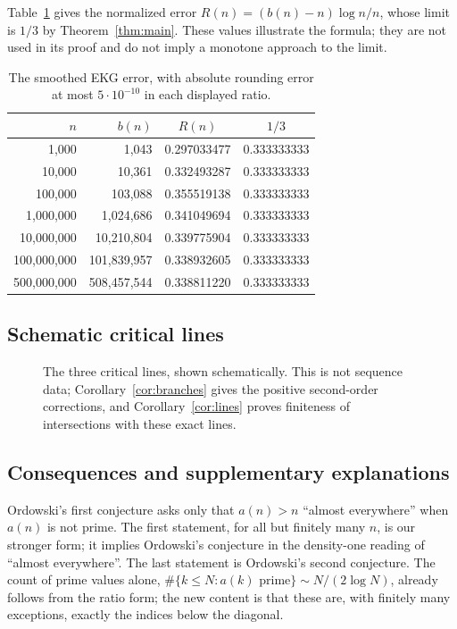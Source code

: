 Table~\ref{tab:ratio-original} gives the normalized error
$R(n)=(b(n)-n)\log n/n$, whose limit is $1/3$ by
Theorem~\ref{thm:main}. These values illustrate the formula; they are
not used in its proof and do not imply a monotone approach to the limit.
\begin{table}[ht]
\centering
\begin{tabular}{r r c c}
$n$ & $b(n)$ & $R(n)$ & $1/3$\\\hline
1,000 & 1,043 & 0.297033477 & 0.333333333 \\
10,000 & 10,361 & 0.332493287 & 0.333333333 \\
100,000 & 103,088 & 0.355519138 & 0.333333333 \\
1,000,000 & 1,024,686 & 0.341049694 & 0.333333333 \\
10,000,000 & 10,210,804 & 0.339775904 & 0.333333333 \\
100,000,000 & 101,839,957 & 0.338932605 & 0.333333333 \\
500,000,000 & 508,457,544 & 0.338811220 & 0.333333333 \\
\end{tabular}
\caption{The smoothed EKG error, with absolute rounding error at most
$5\cdot10^{-10}$ in each displayed ratio.}\label{tab:ratio-original}
\end{table}


\subsection*{Schematic critical lines}
\begin{figure}[ht]
\centering
{}
\caption{The three critical lines, shown schematically. This is not
sequence data; Corollary~\ref{cor:branches} gives the positive
second-order corrections, and Corollary~\ref{cor:lines} proves
finiteness of intersections with these exact lines.}
\label{fig:branches-schematic}
\end{figure}
\subsection*{Consequences and supplementary explanations}
Ordowski's first conjecture asks only that $a(n)>n$ ``almost
everywhere'' when $a(n)$ is not prime. The first statement, for all but
finitely many $n$, is our stronger form; it implies Ordowski's conjecture in
the density-one reading of ``almost everywhere''. The last statement is Ordowski's second
conjecture. The count of prime values alone,
$\#\{k\leq N:a(k)\text{ prime}\}\sim N/(2\log N)$, already follows from
the ratio form; the new content is that these are, with finitely many
exceptions, exactly the indices below the diagonal.


